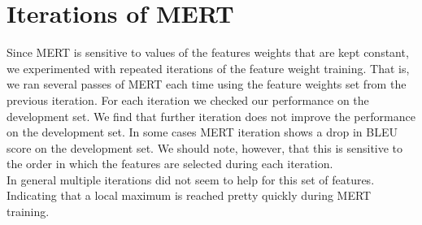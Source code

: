 \documentclass[11pt]{article}
\begin{document}
\section{Iterations of MERT}
Since MERT is sensitive to values of the features weights that are kept
constant, we experimented with repeated iterations of the feature weight
training. That is, we ran several passes of MERT each time using the feature
weights set from the previous iteration. For each iteration we checked our
performance on the development set. We find that further iteration does not
improve the performance on the development set. In some cases MERT iteration
shows a drop in BLEU score on the development set. We should note, however, that
this is sensitive to the order in which the features are selected during each
iteration.\\
In general multiple iterations did not seem to help for this set of features.
Indicating that a local maximum is reached pretty quickly during MERT training.
\end{document}
